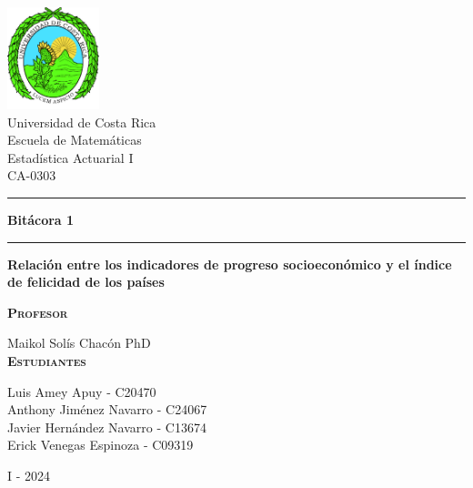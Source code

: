 \begin{titlepage}
\begin{center}
\vspace{2cm}
\includegraphics[width=0.2\textwidth]{root/Logo_ucr.png}~\\[1cm]

{\huge Universidad de Costa Rica} \\
{\large 
Escuela de Matemáticas \\
Estadística Actuarial I \\
CA-0303\\
}

\vspace{1cm}


\hrule
\vspace{.5cm}
{ \Huge \bfseries Bitácora 1} 
\vspace{.5cm}
\hrule
\vspace{1cm}

{\Large \textbf{Relación entre los indicadores de progreso socioeconómico y el índice de felicidad de los países}}
\vspace{1cm}

\textsc{\textbf{Profesor}}\\
\vspace{5px}

Maikol Solís Chacón PhD \\

\vspace{1cm}
\textsc{\textbf{Estudiantes}}\\
\vspace{5px}


Luis Amey Apuy - C20470\\
\vspace{5px}
Anthony Jiménez Navarro - C24067\\
\vspace{5px}
Javier Hernández Navarro - C13674\\
\vspace{5px}
Erick Venegas Espinoza - C09319\\

\vspace{1cm}

I - 2024 \\


\end{center}
\end{titlepage}